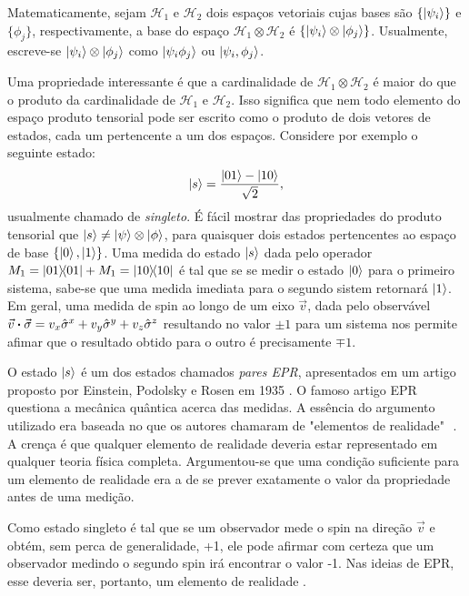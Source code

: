 Matematicamente, sejam $\mathcal{H}_1$ e $\mathcal{H}_2$ dois espaços vetoriais cujas bases são $\{ \ket{\psi_i} \}$ e $\{ \phi_j \}$, respectivamente, a base  do espaço $\mathcal{H}_1 \otimes \mathcal{H}_2$ é $\{ \ket{ \psi_i } \otimes \ket{ \phi_j } \}$. Usualmente, escreve-se $\ket{ \psi_i } \otimes \ket{\phi_j}$ como $\ket{\psi_i \phi_j}$ ou $\ket{\psi_i, \phi_j}$. 

Uma propriedade interessante é que a cardinalidade de $\mathcal{H}_1 \otimes \mathcal{H}_2$ é maior do que o produto da cardinalidade de $\mathcal{H}_1$ e $\mathcal{H}_2$. Isso significa que nem todo elemento do espaço produto tensorial pode ser escrito como o produto de dois vetores de estados, cada um pertencente a um dos espaços.
Considere por exemplo o seguinte estado:
\begin{equation}
	\ket{s} = \frac{\ket{01} - \ket{10}}{\sqrt{2}},
	\label{eq:II.10}
\end{equation}
usualmente chamado de \textit{singleto}. É fácil mostrar das propriedades do produto tensorial que $\ket{s} \neq \ket{\psi} \otimes \ket{\phi}$, para quaisquer dois estados pertencentes ao espaço de base $\{ \ket{0}, \ket{1} \}$. Uma medida do estado $\ket{s}$ dada pelo operador $M_1 = \ketbra{01} + M_1 = \ketbra{10}$ é tal que se se medir o estado $\ket{0}$ para o primeiro sistema, sabe-se que uma medida imediata para o segundo sistem retornará $\ket{1}$. Em geral, uma medida de spin ao longo de um eixo $\vec{v}$, dada pelo observável $\vec{v} \vdot \vec{\sigma} = v_x \sx + v_y \sy + v_z \sz$ resultando no valor $\pm 1$ para um sistema nos permite afimar que o resultado obtido para o outro é precisamente $\mp 1$. 

O estado $\ket{s}$ é um dos estados chamados \textit{pares EPR}, apresentados em um artigo proposto por Einstein, Podolsky e Rosen em 1935 \cite{EPR}. O famoso artigo EPR questiona a mecânica quântica acerca das medidas. A essência do argumento utilizado era baseada no que os autores chamaram de "elementos de realidade" $ $ \cite{QuantumCompInf}. A crença é que qualquer elemento de realidade deveria estar representado em qualquer teoria física completa. Argumentou-se que uma condição suficiente para um elemento de realidade era a de se prever exatamente o valor da propriedade antes de uma medição. 

Como estado singleto é tal que se um observador mede o spin na direção $\vec{v}$ e obtém, sem perca de generalidade, +1, ele pode afirmar com certeza que um observador medindo o segundo spin irá encontrar o valor -1. Nas ideias de EPR, esse deveria ser, portanto, um elemento de realidade \cite{QuantumCompInf}.

